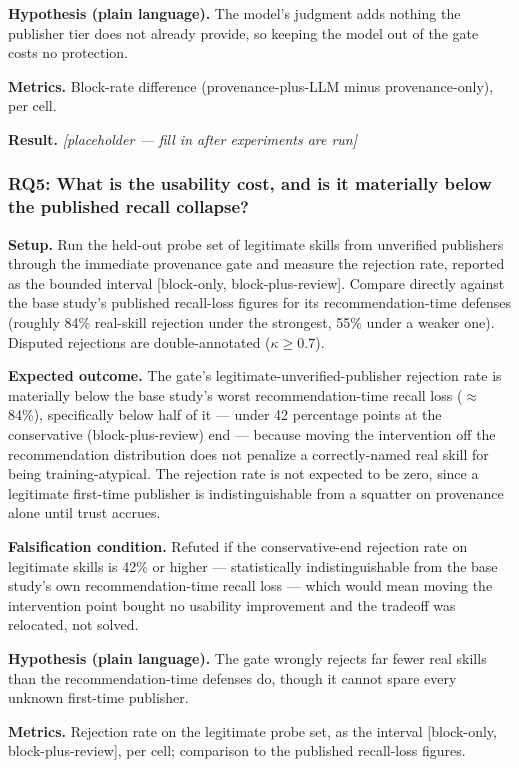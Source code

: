 \documentclass[11pt]{article}
\newcommand{\ph}{\textit{[placeholder --- fill in after experiments are run]}}
\begin{document}
\textbf{Hypothesis (plain language).} The model's judgment adds nothing the publisher tier does not already provide, so keeping the model out of the gate costs no protection.

\textbf{Metrics.} Block-rate difference (provenance-plus-LLM minus provenance-only), per cell.

\textbf{Result.} \ph

\subsubsection{RQ5: What is the usability cost, and is it materially below the published recall collapse?}
\textbf{Setup.} Run the held-out probe set of legitimate skills from unverified publishers through the immediate provenance gate and measure the rejection rate, reported as the bounded interval [block-only, block-plus-review]. Compare directly against the base study's published recall-loss figures for its recommendation-time defenses (roughly 84\% real-skill rejection under the strongest, 55\% under a weaker one). Disputed rejections are double-annotated ($\kappa \geq 0.7$).

\textbf{Expected outcome.} The gate's legitimate-unverified-publisher rejection rate is materially below the base study's worst recommendation-time recall loss ($\approx$84\%), specifically below half of it --- under 42 percentage points at the conservative (block-plus-review) end --- because moving the intervention off the recommendation distribution does not penalize a correctly-named real skill for being training-atypical. The rejection rate is not expected to be zero, since a legitimate first-time publisher is indistinguishable from a squatter on provenance alone until trust accrues.

\textbf{Falsification condition.} Refuted if the conservative-end rejection rate on legitimate skills is 42\% or higher --- statistically indistinguishable from the base study's own recommendation-time recall loss --- which would mean moving the intervention point bought no usability improvement and the tradeoff was relocated, not solved.

\textbf{Hypothesis (plain language).} The gate wrongly rejects far fewer real skills than the recommendation-time defenses do, though it cannot spare every unknown first-time publisher.

\textbf{Metrics.} Rejection rate on the legitimate probe set, as the interval [block-only, block-plus-review], per cell; comparison to the published recall-loss figures.
\end{document}
